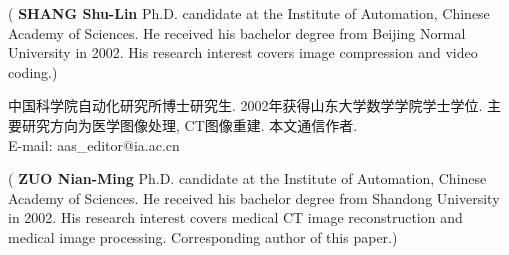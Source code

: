 \documentclass{aas}
\begin{document}
\begin{multicols}{2}
\begin{biography}
\noindent({\bf
SHANG Shu-Lin
}\quad
Ph.D. candidate at the
Institute of Automation, Chinese Academy of Sciences. He received
his bachelor degree from Beijing Normal University in 2002. His research
interest covers image compression and video coding.)
\end{biography}

\begin{biography}
\quad
中国科学院自动化研究所博士研究生.
2002年获得山东大学数学学院学士学位.
主要研究方向为医学图像处理, CT图像重建. 本文通信作者.
\\E-mail: aas\_editor@ia.ac.cn

\noindent({\bf
ZUO Nian-Ming
}\quad
Ph.D. candidate at the Institute of Automation, Chinese Academy of Sciences. He received his bachelor degree from Shandong University in 2002. His research interest covers medical CT image reconstruction and medical image processing. Corresponding author of this paper.)
\\
\\
\\
\\
\\
\\
\\
\\
\\
\\
\\
\end{biography}

\end{multicols}
\end{document}
